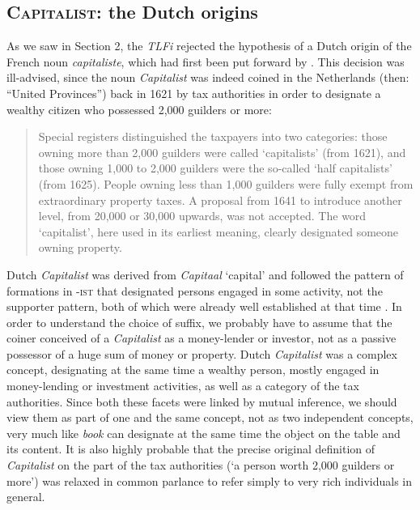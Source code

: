 \documentclass[output=paper]{langsci/langscibook}
\begin{document}
\subsection{\textsc{Capitalist}: the Dutch origins}

As we saw in Section 2, the \emph{TLFi} rejected the hypothesis of a
Dutch origin of the French noun \emph{capitaliste}, which had first been
put forward by %
\citet[nr. XXV]{Barbier44}%
%
. This decision was
ill-advised, since the noun \emph{Capitalist} was indeed coined in the
Netherlands (then: ``United Provinces'') back in 1621 by tax authorities
in order to designate a wealthy citizen who possessed 2,000 guilders or
more:


\begin{quote}
Special registers distinguished the taxpayers into two categories: those
owning more than 2,000 guilders were called `capitalists' (from 1621),
and those owning 1,000 to 2,000 guilders were the so-called `half
capitalists' (from 1625). People owning less than 1,000 guilders were
fully exempt from extraordinary property taxes. A proposal from 1641 to
introduce another level, from 20,000 or 30,000 upwards, was not
accepted. The word `capitalist', here used in its earliest meaning,
clearly designated someone owning property.
\citep[122--123]{Hart93}
\end{quote}

Dutch \emph{Capitalist} was derived from \emph{Capitaal} `capital' and
followed the pattern of formations in -\textsc{ist} that designated
persons engaged in some activity, not the supporter pattern, both of
which were already well established at that time %
\citep[see][]{wolf72}%
%
. In
order to understand the choice of suffix, we probably have to assume
that the coiner conceived of a \emph{Capitalist} as a money-lender or
investor, not as a passive possessor of a huge sum of money or property.
Dutch \emph{Capitalist} was a complex concept, designating at the same
time a wealthy person, mostly engaged in money-lending or investment
activities, as well as a category of the tax authorities. Since both these
facets were linked by mutual inference, we should view them as part of
one and the same concept, not as two independent concepts, very much
like \emph{book} can designate at the same time the object on the table
and its content. It is also highly probable that the precise original
definition of \emph{Capitalist} on the part of the tax authorities (`a
person worth 2,000 guilders or more') was relaxed in common parlance to
refer simply to very rich individuals in general.
\end{document}
